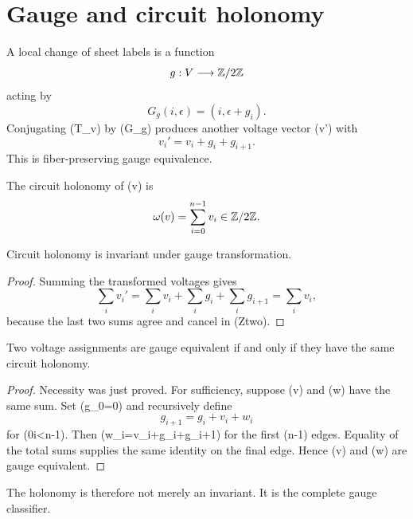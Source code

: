 \section{Gauge and circuit holonomy}

A local change of sheet labels is a function
\[
g:V\longrightarrow\mathbb{Z}/2\mathbb{Z}
\]
acting by
\[
G_g(i,\epsilon)=(i,\epsilon+g_i).
\]
Conjugating (T_v) by (G_g) produces another voltage vector (v') with
\[
v_i'=v_i+g_i+g_{i+1}.
\]
This is fiber-preserving gauge equivalence.

\begin{definition}
The circuit holonomy of (v) is
\[
\omega(v)=\sum_{i=0}^{n-1}v_i\in\mathbb{Z}/2\mathbb{Z}.
\]
\end{definition}

\begin{proposition}
Circuit holonomy is invariant under gauge transformation.
\end{proposition}

\begin{proof}
Summing the transformed voltages gives
\[
\sum_i v_i'
=\sum_i v_i+\sum_i g_i+\sum_i g_{i+1}
=\sum_i v_i,
\]
because the last two sums agree and cancel in (Ztwo).
\end{proof}

\begin{proposition}
Two voltage assignments are gauge equivalent if and only if they have the
same circuit holonomy.
\end{proposition}

\begin{proof}
Necessity was just proved. For sufficiency, suppose (v) and (w) have the
same sum. Set (g_0=0) and recursively define
\[
g_{i+1}=g_i+v_i+w_i
\]
for (0\leq i<n-1). Then (w_i=v_i+g_i+g_{i+1}) for the first (n-1)
edges. Equality of the total sums supplies the same identity on the final
edge. Hence (v) and (w) are gauge equivalent.
\end{proof}

The holonomy is therefore not merely an invariant. It is the complete gauge
classifier.

